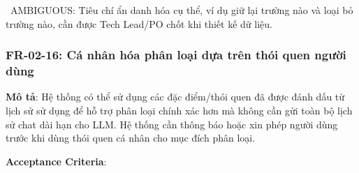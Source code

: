 \warningicon\  AMBIGUOUS: Tiêu chí ẩn danh hóa cụ thể, ví dụ giữ lại trường nào và loại bỏ trường nào, cần được Tech Lead/PO chốt khi thiết kế dữ liệu.



\subsubsection{FR-02-16: Cá nhân hóa phân loại dựa trên thói quen người dùng}

\textbf{Mô tả}: Hệ thống có thể sử dụng các đặc điểm/thói quen đã được đánh dấu từ lịch sử sử dụng để hỗ trợ phân loại chính xác hơn mà không cần gửi toàn bộ lịch sử chat dài hạn cho LLM. Hệ thống cần thông báo hoặc xin phép người dùng trước khi dùng thói quen cá nhân cho mục đích phân loại.



\textbf{Acceptance Criteria}:

